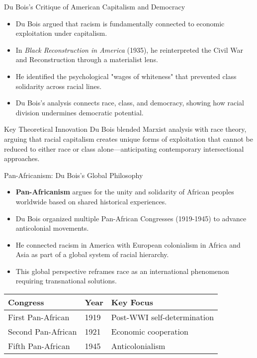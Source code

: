 \documentclass{beamer}
\begin{document}
	\begin{frame}{Du Bois's Critique of American Capitalism and Democracy}
		\begin{itemize}
			\item Du Bois argued that racism is fundamentally connected to economic exploitation under capitalism.
			\item In \textit{Black Reconstruction in America} (1935), he reinterpreted the Civil War and Reconstruction through a materialist lens.
			\item He identified the psychological "wages of whiteness" that prevented class solidarity across racial lines.
			\item Du Bois's analysis connects race, class, and democracy, showing how racial division undermines democratic potential.
		\end{itemize}
		
		\begin{block}{Key Theoretical Innovation}
			Du Bois blended Marxist analysis with race theory, arguing that racial capitalism creates unique forms of exploitation that cannot be reduced to either race or class alone—anticipating contemporary intersectional approaches.
		\end{block}
	\end{frame}
	
	\begin{frame}{Pan-Africanism: Du Bois's Global Philosophy}
		\begin{itemize}
			\item \textbf{Pan-Africanism} argues for the unity and solidarity of African peoples worldwide based on shared historical experiences.
			\item Du Bois organized multiple Pan-African Congresses (1919-1945) to advance anticolonial movements.
			\item He connected racism in America with European colonialism in Africa and Asia as part of a global system of racial hierarchy.
			\item This global perspective reframes race as an international phenomenon requiring transnational solutions.
		\end{itemize}
		
		\begin{tabular}{|l|l|l|}
			\hline
			\textbf{Congress} & \textbf{Year} & \textbf{Key Focus} \\
			\hline
			First Pan-African & 1919 & Post-WWI self-determination \\
			Second Pan-African & 1921 & Economic cooperation \\
			Fifth Pan-African & 1945 & Anticolonialism \\
			\hline
		\end{tabular}
	\end{frame}
	
\end{document}
